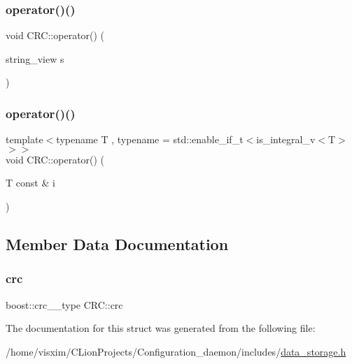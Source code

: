 \mbox{\label{structCRC_a8d02f69866f0cbae7e8b1a41bc9c2d5b}} 
\subsubsection{\texorpdfstring{operator()()}{operator()()}\hspace{0.1cm}{\footnotesize\ttfamily [1/2]}}
{\footnotesize\ttfamily void C\+R\+C\+::operator() (\begin{DoxyParamCaption}\item[{string\+\_\+view}]{s }\end{DoxyParamCaption})\hspace{0.3cm}{\ttfamily [inline]}}

\mbox{\label{structCRC_a3a15630422ed9cdd975336ec7d350beb}} 
\subsubsection{\texorpdfstring{operator()()}{operator()()}\hspace{0.1cm}{\footnotesize\ttfamily [2/2]}}
{\footnotesize\ttfamily template$<$typename T , typename  = std\+::enable\+\_\+if\+\_\+t$<$is\+\_\+integral\+\_\+v$<$\+T$>$$>$$>$ \\
void C\+R\+C\+::operator() (\begin{DoxyParamCaption}\item[{T const \&}]{i }\end{DoxyParamCaption})\hspace{0.3cm}{\ttfamily [inline]}}



\subsection{Member Data Documentation}
\mbox{\label{structCRC_aff4391b2e5fbfad71138bed74eaf5b11}} 
\subsubsection{\texorpdfstring{crc}{crc}}
{\footnotesize\ttfamily boost\+::crc\+\_\+\_\+type C\+R\+C\+::crc}



The documentation for this struct was generated from the following file\+:\begin{DoxyCompactItemize}
\item 
/home/visxim/\+C\+Lion\+Projects/\+Configuration\+\_\+daemon/includes/\hyperlink{data__storage_8h}{data\+\_\+storage.\+h}\end{DoxyCompactItemize}
